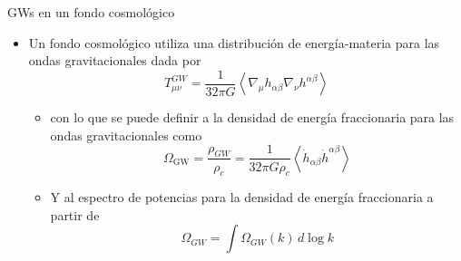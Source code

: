 \documentclass{beamer}
\begin{document}
            \begin{frame}{GWs en un fondo cosmológico}
                \begin{itemize}
                    \item[\textcolor{brown}{$\bullet$}] Un fondo cosmológico utiliza una distribución de energía-materia para las ondas gravitacionales dada por
                    \begin{equation*}
                        T^{GW}_{\mu\nu} = \frac{1}{32 \pi G} \left\langle \nabla_\mu h_{\alpha \beta} \nabla_\nu h^{\alpha \beta} \right\rangle
                    \end{equation*}
                    \begin{itemize}
                        \item[\textcolor{cyan}{$\Longrightarrow$}] con lo que se puede definir a la densidad de energía fraccionaria para las ondas gravitacionales como
                        \begin{equation*}
                            \Omega_{\text{GW}} = \frac{\rho_{GW}}{\rho_c} = \frac{1}{32 \pi G \rho_c} \left\langle \dot{h}_{\alpha \beta} \dot{h}^{\alpha \beta} \right\rangle
                        \end{equation*}
                        \item[\textcolor{cyan}{$\Longrightarrow$}] Y al espectro de potencias para la densidad de energía fraccionaria a partir de
                        \begin{equation*}
                            \Omega_{GW} = \int \Omega_{GW} (k) \, d \log k
                        \end{equation*}
                    \end{itemize}
                \end{itemize}
            \end{frame}
\end{document}
